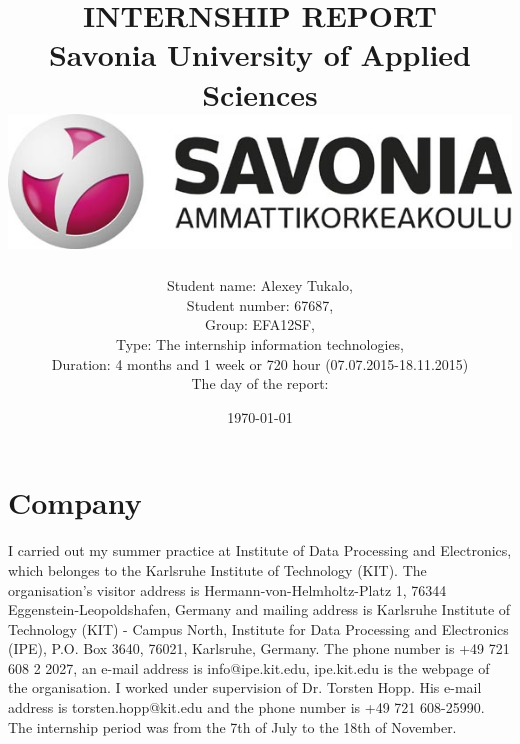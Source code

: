 \documentclass[english]{article}
\date{}
\begin{document}
\title{\vspace{2in}INTERNSHIP REPORT\\
\small Savonia University of Applied Sciences\\
\vspace{0.5in}\includegraphics{savonia.jpg}}

\nopagebreak
\maketitle


\vspace{3in}

\author{
\begin{flushleft}
Student name: Alexey Tukalo,\\
Student number: 67687,\\
Group: EFA12SF,\\
Type: The internship information technologies,\\
Duration: 4 months and 1 week or 720 hour (07.07.2015-18.11.2015)\\
The day of the report: \date{\today}
\end{flushleft}
}

\thispagestyle{empty}

\newpage
\setcounter{page}{1}
\setcounter{tocdepth}{2}
\tableofcontents

\newpage


\section{Company}

I carried out my summer practice at Institute of Data Processing and Electronics, which belonges to the Karlsruhe Institute of Technology (KIT). The organisation's visitor address is Hermann-von-Helmholtz-Platz 1, 76344 Eggenstein-Leopoldshafen, Germany and mailing address is Karlsruhe Institute of Technology (KIT) - Campus North, Institute for Data Processing and Electronics (IPE), P.O. Box 3640, 76021, Karlsruhe, Germany. The phone number is +49 721 608 2 2027, an e-mail address is info@ipe.kit.edu, ipe.kit.edu is the webpage of the organisation. I worked under supervision of Dr. Torsten Hopp. His e-mail address is torsten.hopp@kit.edu and the phone number is +49 721 608-25990. The internship period was from the 7th of July to the 18th of November.
\end{document}
